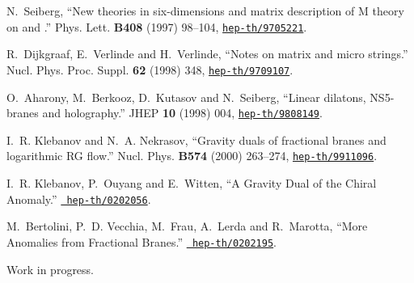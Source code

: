 \documentclass[a4paper,11pt]{article}
\begin{document}
\begin{thebibliography}{10}
N.~Seiberg, ``New theories in six-dimensions and matrix description of {M}
  theory on {\coordHE{}} and {\coordHE{}}.'' Phys. Lett. {\bf B408} (1997) 98--104,
  \href{http://xxx.lanl.gov/abs/hep-th/9705221}{{\tt hep-th/9705221}}.

R.~Dijkgraaf, E.~Verlinde and H.~Verlinde, ``Notes on matrix and micro
  strings.'' Nucl. Phys. Proc. Suppl. {\bf 62} (1998) 348,
  \href{http://xxx.lanl.gov/abs/hep-th/9709107}{{\tt hep-th/9709107}}.

O.~Aharony, M.~Berkooz, D.~Kutasov and N.~Seiberg, ``Linear dilatons,
  {NS5-branes} and holography.'' JHEP {\bf 10} (1998) 004,
  \href{http://xxx.lanl.gov/abs/hep-th/9808149}{{\tt hep-th/9808149}}.

I.~R. Klebanov and N.~A. Nekrasov, ``Gravity duals of fractional branes and
  logarithmic RG flow.'' Nucl. Phys. {\bf B574} (2000) 263--274,
  \href{http://xxx.lanl.gov/abs/hep-th/9911096}{{\tt hep-th/9911096}}.

I.~R. Klebanov, P.~Ouyang and E.~Witten, ``A Gravity Dual of the Chiral
  Anomaly.'' \href{http://xxx.lanl.gov/abs/hep-th/0202056}{{\tt
  hep-th/0202056}}. %

M.~Bertolini, P.~D. Vecchia, M.~Frau, A.~Lerda and R.~Marotta, ``More Anomalies
  from Fractional Branes.''
  \href{http://xxx.lanl.gov/abs/http://arXiv.org/abs/hep-th/0202195}{{\tt
  hep-th/0202195}}. %

 Work in progress.

\end{thebibliography}\endgroup
\end{document}
